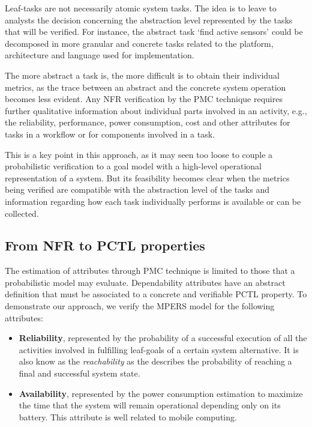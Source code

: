 Leaf-tasks are not necessarily atomic system tasks. The idea is to leave to analysts the decision concerning the abstraction level represented by the tasks that will be verified. For instance, the abstract task `find active sensors' could be decomposed in more granular and concrete tasks related to the platform, architecture and language used for implementation. 

The more abstract a task is, the more difficult is to obtain their individual metrics, as the trace between an abstract and the concrete system operation becomes less evident. Any NFR verification by the PMC technique requires further qualitative information about individual parts involved in an activity, e.g., the reliability, performance, power consumption, cost and other attributes for tasks in a workflow or for components involved in a task.

This is a key point in this approach, as it may seen too loose to couple a probabilistic verification to a goal model with a high-level operational representation of a system. But its feasibility becomes clear when the metrics being verified are compatible with the abstraction level of the tasks and information regarding how each task individually performs is available or can be collected.


\subsection{From NFR to PCTL properties}

The estimation of attributes through PMC technique is limited to those that a probabilistic model may evaluate. Dependability attributes have an abstract definition that must be associated to a concrete and verifiable PCTL property. To demonstrate our approach, we verify the MPERS model for the following attributes:

\begin{itemize}

\item \textbf{Reliability}, represented by the probability of a successful execution of all the activities involved in fulfilling leaf-goals of a certain system alternative. It is also know as the \textit{reachability} as the describes the probability of reaching a final and successful system state. 
\bigskip

\item \textbf{Availability}, represented by the power consumption estimation to maximize the time that the system will remain operational depending only on its battery. This attribute is well related to mobile computing. 
\medskip

\end{itemize}


